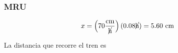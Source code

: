 \documentclass{beamer}
\begin{document}
\begin{frame}
\frametitle{MRU}
% 
{\large
\begin{equation}
x=
\left(70\frac{\text{cm}}{\cancel{\text{h}}}\right)
(0.08\cancel{\text{h}})=
5.60~\text{cm}
\end{equation}}

                               
 
La distancia que recorre el tren es
\fbox{5.60 cm}

                                                             
                                                               
                                                               
                                                               
\end{frame}

\end{document}
